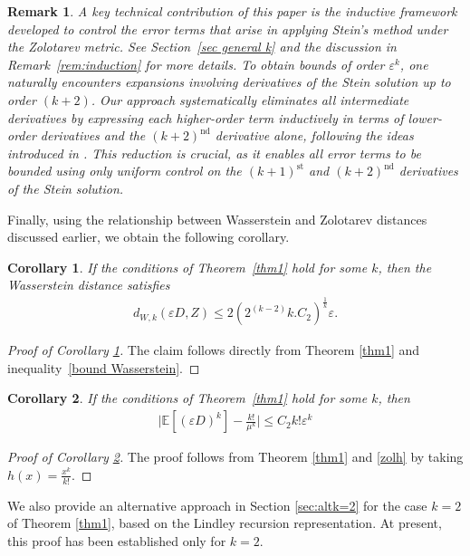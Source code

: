 \documentclass[11pt,letterpaper,reqno]{article}
\theoremstyle{thmstyleone}%
\theoremstyle{thmstyletwo}%
\newtheorem{remark}{Remark}%
\newtheorem{corollary}{Corollary}
\theoremstyle{thmstylethree}%
\numberwithin{equation}{section}
\begin{document}
\begin{remark}
A key technical contribution of this paper is the inductive framework developed to control the error terms that arise in applying Stein’s method under the Zolotarev metric. See Section~\ref{sec general k} and the discussion in Remark~\ref{rem:induction} for more details. To obtain bounds of order $\varepsilon^k$, one naturally encounters expansions involving derivatives of the Stein solution up to order $(k+2)$. Our approach systematically eliminates all intermediate derivatives by expressing each higher-order term inductively in terms of lower-order derivatives and the $(k+2)^{\text{nd}}$ derivative alone, following the ideas introduced in \cite{BDF}. This reduction is crucial, as it enables all error terms to be bounded using only uniform control on the $(k+1)^{\text{st}}$ and $(k+2)^{\text{nd}}$ derivatives of the Stein solution.
\end{remark}


Finally, using the relationship between Wasserstein and Zolotarev distances discussed earlier, we obtain the following corollary.
\begin{corollary}\label{cor2}
    If the conditions of Theorem~\ref{thm1} hold for some $k$, then the Wasserstein distance satisfies
    \begin{align*}
        d_{W,k}( \varepsilon D,Z) \leq 2(2^{(k-2)}k.C_2)^{\frac{1}{k}} \varepsilon.
    \end{align*}
\end{corollary}
\begin{proof}[Proof of Corollary \ref{cor2}]
    The claim follows directly from Theorem \ref{thm1} and %
    inequality~\eqref{bound Wasserstein}.
\end{proof}

\begin{corollary}\label{cor3}
 If the conditions of Theorem~\ref{thm1} hold for some $k$, then 
 \begin{align*}
     \bigg|\mathbb E[(\varepsilon D)^k]-\frac{k!}{\mu^k}\bigg| \leq C_2 k!\varepsilon^k
 \end{align*}
 \end{corollary}
 \begin{proof}[Proof of Corollary \ref{cor3}]
     The proof follows from Theorem \ref{thm1} and \eqref{zolh} by taking $h(x)=\frac{x^k}{k!}$. 
 \end{proof}

We also provide an alternative approach in Section \ref{sec:altk=2} for the case $k=2$ of Theorem \ref{thm1}, based on the Lindley recursion representation. At present, this proof has been established only for $k=2$.
\end{document}
